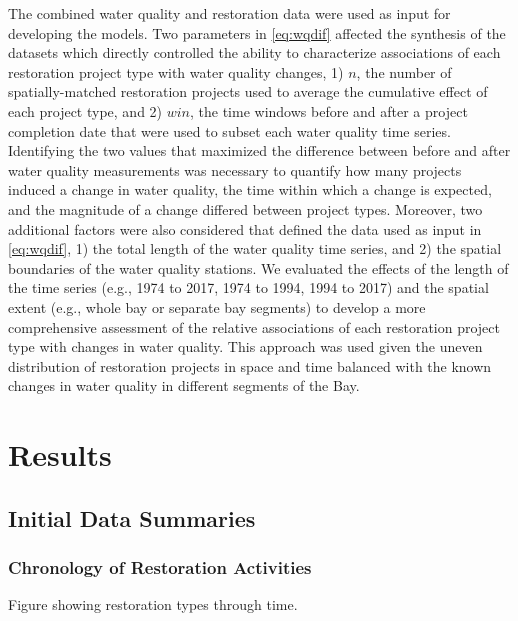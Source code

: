 \documentclass[]{article}
\begin{document}
The combined water quality and restoration data were used as input for
developing the models. Two parameters in \cref{eq:wqdif} affected the
synthesis of the datasets which directly controlled the ability to
characterize associations of each restoration project type with water
quality changes, 1) \(n\), the number of spatially-matched restoration
projects used to average the cumulative effect of each project type, and
2) \(win\), the time windows before and after a project completion date
that were used to subset each water quality time series. Identifying the
two values that maximized the difference between before and after water
quality measurements was necessary to quantify how many projects induced
a change in water quality, the time within which a change is expected,
and the magnitude of a change differed between project types. Moreover,
two additional factors were also considered that defined the data used
as input in \cref{eq:wqdif}, 1) the total length of the water quality
time series, and 2) the spatial boundaries of the water quality
stations. We evaluated the effects of the length of the time series
(e.g., 1974 to 2017, 1974 to 1994, 1994 to 2017) and the spatial extent
(e.g., whole bay or separate bay segments) to develop a more
comprehensive assessment of the relative associations of each
restoration project type with changes in water quality. This approach
was used given the uneven distribution of restoration projects in space
and time balanced with the known changes in water quality in different
segments of the Bay.

\hypertarget{results}{%
\section{Results}\label{results}}

\hypertarget{initial-data-summaries}{%
\subsection{Initial Data Summaries}\label{initial-data-summaries}}

\hypertarget{chronology-of-restoration-activities}{%
\subsubsection{Chronology of Restoration
Activities}\label{chronology-of-restoration-activities}}

Figure showing restoration types through time.
\end{document}
